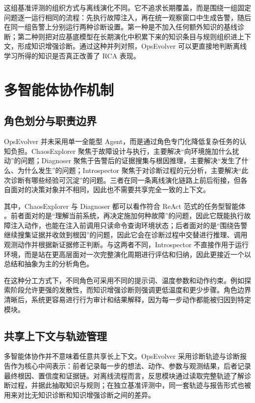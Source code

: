 这组基准评测的组织方式与离线演化不同。它不追求长期覆盖，而是围绕一组固定问题逐一运行相同的流程：先执行故障注入，再在统一观察窗口中生成告警，随后在同一组告警上分别运行两种诊断设置。第一种是不加入任何额外知识的基线诊断；第二种则把对应基底模型在长期演化中积累下来的知识条目与规则组织进上下文，形成知识增强诊断。通过这种并列对照，OpsEvolver 可以更直接地判断离线学习所得的知识是否真正改善了 RCA 表现。

\section{多智能体协作机制}
\label{sec:multi_agent_collaboration}

\subsection{角色划分与职责边界}

OpsEvolver 并未采用单一全能型 Agent，而是通过角色专门化降低复杂任务的认知负担。ChaosExplorer 聚焦于故障设计与执行，主要解决“向环境施加什么扰动”的问题；Diagnoser 聚焦于告警后的证据搜集与根因推理，主要解决“发生了什么、为什么发生”的问题；Introspector 聚焦于对诊断过程的元分析，主要解决“此次诊断有哪些经验可沉淀”的问题。三者在同一条离线演化链路上前后衔接，但各自面对的决策对象并不相同，因此也不需要共享完全一致的上下文。

其中，ChaosExplorer 与 Diagnoser 都可以看作符合 ReAct 范式的任务型智能体 \cite{yao2022react}。前者面对的是“理解当前系统，再决定施加何种故障”的问题，因此它既能执行故障注入动作，也能在注入前调用只读命令查询环境状态；后者面对的是“围绕告警继续搜集证据并收敛到根因”的问题，因此它会在诊断过程中交替进行推理、调用观测动作并根据新证据修正判断。与这两者不同，Introspector 不直接作用于运行环境，而是站在更高层面对一次完整演化周期进行评估和归纳，因此更接近一个以总结和抽象为主的分析角色。

在这种分工方式下，不同角色可采用不同的提示词、温度参数和动作约束。例如探索阶段允许更强的发散性，而知识增强诊断则强调更低温度和更少步骤。角色边界清晰后，系统更容易进行行为审计和结果解释，因为每一步动作都能被归因到特定模块。

\subsection{共享上下文与轨迹管理}

多智能体协作并不意味着任意共享长上下文。OpsEvolver 采用诊断轨迹与诊断报告作为核心中间表示：前者记录每一步的想法、动作、参数与观测结果，后者记录最终根因、置信度和证据链。对离线流程而言，反思模块通过读取完整轨迹了解诊断过程，并据此抽取知识与规则；在独立基准评测中，同一套轨迹与报告形式也被用来对比无知识诊断和知识增强诊断之间的差异。

